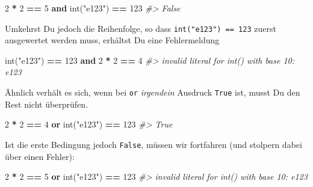 \documentclass[
]{book}
\newenvironment{Shaded}{\begin{snugshade}}{\end{snugshade}}
\newcommand{\BuiltInTok}[1]{#1}
\newcommand{\CommentTok}[1]{\textcolor[rgb]{0.56,0.35,0.01}{\textit{#1}}}
\newcommand{\DecValTok}[1]{\textcolor[rgb]{0.00,0.00,0.81}{#1}}
\newcommand{\KeywordTok}[1]{\textcolor[rgb]{0.13,0.29,0.53}{\textbf{#1}}}
\newcommand{\NormalTok}[1]{#1}
\newcommand{\OperatorTok}[1]{\textcolor[rgb]{0.81,0.36,0.00}{\textbf{#1}}}
\newcommand{\StringTok}[1]{\textcolor[rgb]{0.31,0.60,0.02}{#1}}
\begin{document}
\begin{Shaded}
\begin{Highlighting}[]
\DecValTok{2} \OperatorTok{*} \DecValTok{2} \OperatorTok{==} \DecValTok{5} \KeywordTok{and} \BuiltInTok{int}\NormalTok{(}\StringTok{"e123"}\NormalTok{) }\OperatorTok{==} \DecValTok{123}
\CommentTok{\#\textgreater{} False}
\end{Highlighting}
\end{Shaded}

Umkehrst Du jedoch die Reihenfolge, so dass \texttt{int("e123")\ ==\ 123} zuerst ausgewertet werden muss, erhältst Du eine Fehlermeldung

\begin{Shaded}
\begin{Highlighting}[]
\BuiltInTok{int}\NormalTok{(}\StringTok{"e123"}\NormalTok{) }\OperatorTok{==} \DecValTok{123} \KeywordTok{and} \DecValTok{2} \OperatorTok{*} \DecValTok{2} \OperatorTok{==} \DecValTok{4}
\CommentTok{\#\textgreater{} invalid literal for int() with base 10: \textquotesingle{}e123\textquotesingle{}}
\end{Highlighting}
\end{Shaded}

Ähnlich verhält es sich, wenn bei \texttt{or} \emph{irgendein} Ausdruck \texttt{True} ist, musst Du den Rest nicht überprüfen.

\begin{Shaded}
\begin{Highlighting}[]
\DecValTok{2} \OperatorTok{*} \DecValTok{2} \OperatorTok{==} \DecValTok{4} \KeywordTok{or} \BuiltInTok{int}\NormalTok{(}\StringTok{"e123"}\NormalTok{) }\OperatorTok{==} \DecValTok{123}
\CommentTok{\#\textgreater{} True}
\end{Highlighting}
\end{Shaded}

Ist die erste Bedingung jedoch \texttt{False}, müssen wir fortfahren (und stolpern dabei über einen Fehler):

\begin{Shaded}
\begin{Highlighting}[]
\DecValTok{2} \OperatorTok{*} \DecValTok{2} \OperatorTok{==} \DecValTok{5} \KeywordTok{or} \BuiltInTok{int}\NormalTok{(}\StringTok{"e123"}\NormalTok{) }\OperatorTok{==} \DecValTok{123}
\CommentTok{\#\textgreater{} invalid literal for int() with base 10: \textquotesingle{}e123\textquotesingle{}}
\end{Highlighting}
\end{Shaded}
\end{document}
